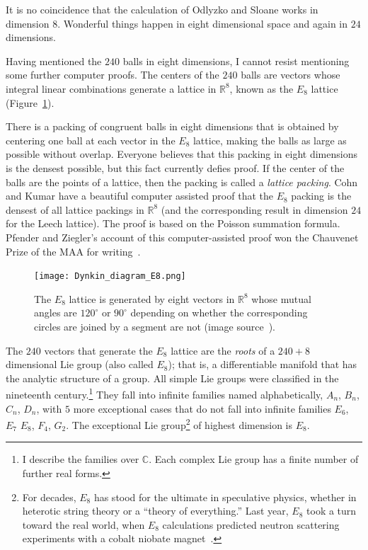 \documentclass{llncs}
\newcommand{\ring}[1]{\mathbb{#1}}
\begin{document}
It is no coincidence that the calculation of Odlyzko and Sloane works
in dimension $8$.  Wonderful things happen in eight dimensional space
and again in $24$ dimensions.

Having mentioned the $240$ balls in eight dimensions, I cannot resist
mentioning some further computer proofs.  The centers of the $240$ balls
are vectors whose integral linear combinations generate 
a lattice in $\ring{R}^8$, known as the $E_8$ lattice (Figure~\ref{fig:e8}).

There is a packing of congruent balls in eight dimensions that is
obtained by centering one ball at each vector in the $E_8$ lattice,
making the balls as large as possible without overlap.  Everyone
believes that this packing in eight dimensions is the densest
possible, but this fact currently defies proof.  If the center of the
balls are the points of a lattice, then the packing is called a {\it
  lattice packing}.  Cohn and Kumar have a beautiful computer assisted
proof that the $E_8$ packing is the densest of all lattice packings in
$\ring{R}^8$ (and the corresponding result in dimension $24$ for the
Leech lattice).  The proof is based on the Poisson summation formula.
Pfender and Ziegler's account of this computer-assisted proof won the
Chauvenet Prize of the MAA for writing~\cite{PZ}.


\begin{figure}[h!]
  \centering
\texttt{[image: Dynkin\_diagram\_E8.png]}
\caption{The $E_8$ lattice is generated by eight vectors in
  $\ring{R}^8$ whose mutual angles are $120^\circ$ or $90^\circ$
  depending on whether the corresponding circles are joined by a
  segment are not (image source~\cite{e8-graphic}).}
\label{fig:e8}
\end{figure}

The $240$ vectors that generate the $E_8$ lattice are the {\it roots}
of a $240+8$ dimensional Lie group (also called $E_8$); that is, a
differentiable manifold that has the analytic structure of a group.
All simple Lie groups were classified in the nineteenth
century.\footnote{I describe the families over $\ring{C}$.  Each
  complex Lie group has a finite number of further real forms.}  They
fall into infinite families named alphabetically, $A_n$, $B_n$, $C_n$,
$D_n$, with $5$ more exceptional cases that do not fall into infinite
families $E_6$, $E_7$ $E_8$, $F_4$, $G_2$.  The exceptional Lie
group\footnote{For decades, $E_8$ has stood for the ultimate in
  speculative physics, whether in heterotic string theory or a
  ``theory of everything.''  Last year, $E_8$ took a turn toward the
  real world, when $E_8$ calculations predicted neutron scattering
  experiments with a cobalt niobate magnet~\cite{BGE8}.} of highest
dimension is $E_8$.
\end{document}
